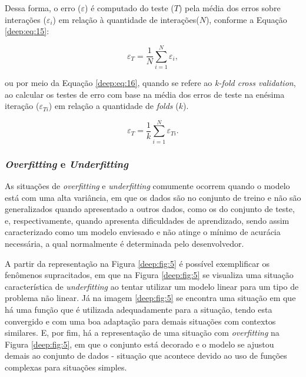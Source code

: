 Dessa forma, o erro ($\varepsilon$) é computado do teste ($T$) pela média dos erros sobre interações ($\varepsilon_i$) em relação à quantidade de interações($N$), conforme a Equação \ref{deep:eq:15}:

\begin{equation}
    \label{deep:eq:15}
    \varepsilon_T = \frac{1}{N} \sum_{i=1}^{N} \varepsilon_i,
\end{equation}

ou por meio da Equação \ref{deep:eq:16}, quando se refere ao \textit{k-fold cross validation}, ao calcular os testes de erro com base na média dos erros de teste na enésima iteração ($\varepsilon_{Ti}$) em relação a quantidade de \textit{folds} ($k$).

\begin{equation}
    \label{deep:eq:16}
    \varepsilon_T = \frac{1}{k} \sum_{i=1}^{N} \varepsilon_{Ti}.
\end{equation}

\subsubsection{\textit{Overfitting} e \textit{Underfitting}}
\label{deep:overunder}

As situações de \textit{overfitting} e \textit{underfitting} comumente ocorrem quando o modelo está com uma alta variância, em que os dados são  no conjunto de treino e não são generalizados quando apresentado a outros dados, como os do conjunto de teste, e, respectivamente, quando apresenta dificuldades de aprendizado, sendo assim caracterizado como um modelo enviesado e não atinge o mínimo de acurácia necessária, a qual normalmente é determinada pelo desenvolvedor.

A partir da representação na Figura \ref{deep:fig:5} é possível exemplificar os fenômenos supracitados, em que na Figura \ref{deep:fig:5} se visualiza uma situação característica de \textit{underfitting} ao tentar utilizar um modelo linear para um tipo de problema não linear. Já na imagem \ref{deep:fig:5} se encontra uma situação em que há uma função que é utilizada adequadamente para a situação, tendo esta convergido e com uma boa adaptação para demais situações com contextos similares. E, por fim, há a representação de uma situação com \textit{overfitting} na Figura \ref{deep:fig:5}, em que o conjunto está decorado e o modelo se ajustou demais ao conjunto de dados - situação que acontece devido ao uso de funções complexas para situações simples.

